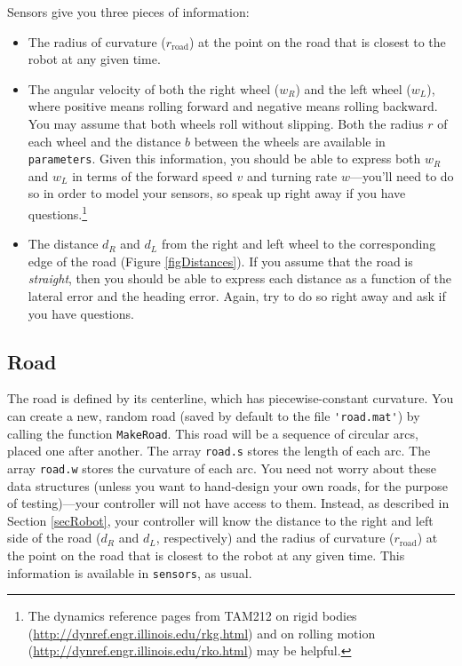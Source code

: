 \documentclass[conf]{new-aiaa}
\begin{document}
Sensors give you three pieces of information:
\begin{itemize}

\item The radius of curvature ($r_\text{road}$) at the point on the road that is closest to the robot at any given time.

\item The angular velocity of both the right wheel ($w_{R}$) and the left wheel ($w_{L}$), where positive means rolling forward and negative means rolling backward. You may assume that both wheels roll without slipping. Both the radius $r$ of each wheel and the distance $b$ between the wheels are available in \lstinline|parameters|. Given this information, you should be able to express both $w_{R}$ and $w_{L}$ in terms of the forward speed $v$ and turning rate $w$---you'll need to do so in order to model your sensors, so speak up right away if you have questions.\footnote{The dynamics reference pages from TAM212 on rigid bodies (\url{http://dynref.engr.illinois.edu/rkg.html}) and on rolling motion (\url{http://dynref.engr.illinois.edu/rko.html}) may be helpful.}

\item The distance $d_{R}$ and $d_{L}$ from the right and left wheel to the corresponding edge of the road (Figure \ref{figDistances}). If you assume that the road is {\em straight}, then you should be able to express each distance as a function of the lateral error and the heading error. Again, try to do so right away and ask if you have questions.

\end{itemize}

\subsection{Road}

The road is defined by its centerline, which has piecewise-constant curvature. You can create a new, random road (saved by default to the file \lstinline|'road.mat'|) by calling the function \lstinline|MakeRoad|. This road will be a sequence of circular arcs, placed one after another. The array \lstinline|road.s| stores the length of each arc. The array \lstinline|road.w| stores the curvature of each arc. You need not worry about these data structures (unless you want to hand-design your own roads, for the purpose of testing)---your controller will not have access to them. Instead, as described in Section \ref{secRobot}, your controller will know the distance to the right and left side of the road ($d_{R}$ and $d_{L}$, respectively) and the radius of curvature ($r_\text{road}$) at the point on the road that is closest to the robot at any given time. This information is available in \lstinline|sensors|, as usual.
\end{document}
